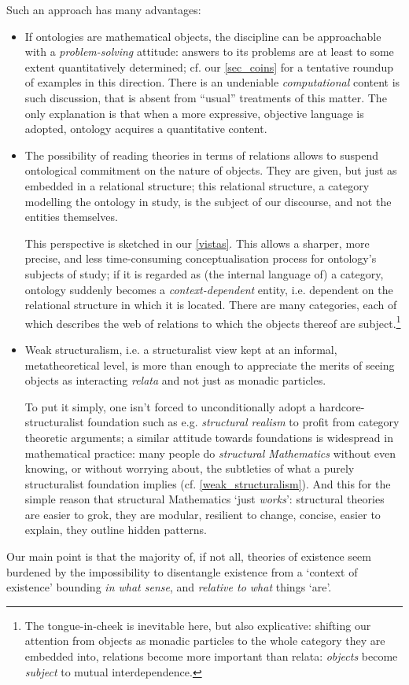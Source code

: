 Such an approach has many advantages:
\begin{itemize}
    \item If ontologies are mathematical objects, the discipline can be approachable with a \emph{problem-solving} attitude: answers to its problems are at least to some extent quantitatively determined; cf. our \autoref{sec_coins} for a tentative roundup of examples in this direction. There is an undeniable \emph{computational} content is such discussion, that is absent from ``usual'' treatments of this matter. The only explanation is that when a more expressive, objective language is adopted, ontology acquires a quantitative content.
    \item The possibility of reading theories in terms of relations allows to suspend ontological commitment on the nature of objects. They are given, but just as embedded in a relational structure; this relational structure, a category modelling the ontology in study, is the subject of our discourse, and not the entities themselves. 
    
    This perspective is sketched in our \autoref{vistas}. This allows a sharper, more precise, and less time-consuming conceptualisation process for ontology's subjects of study; if it is regarded as (the internal language of) a category, ontology suddenly becomes a \emph{context-dependent} entity, i.e. dependent on the relational structure in which it is located. There are many categories, each of which describes the web of relations to which the objects thereof are subject.\footnote{The tongue-in-cheek is inevitable here, but also explicative: shifting our attention from objects as monadic particles to the whole category they are embedded into, relations become more important than relata: \emph{objects} become \emph{subject} to mutual interdependence.}
    \item Weak structuralism, i.e. a structuralist view kept at an informal, metatheoretical level, is more than enough to appreciate the merits of seeing objects as interacting \emph{relata} and not just as monadic particles.
    
    To put it simply, one isn't forced to unconditionally adopt a hardcore-structuralist foundation such as e.g. \emph{structural realism} \cite{bain2013category,eva2016category} to profit from category theoretic arguments; a similar attitude towards foundations is widespread in mathematical practice: many people do \textit{structural Mathematics} without even knowing, or without worrying about, the subtleties of what a purely structuralist foundation implies (cf. \autoref{weak_structuralism}). And this for the simple reason that structural Mathematics `just \emph{works}': structural theories are easier to grok, they are modular, resilient to change, concise, easier to explain, they outline hidden patterns.
\end{itemize}
Our main point is that the majority of, if not all, theories of existence seem burdened by the impossibility to disentangle existence from a `context of existence' bounding \emph{in what sense}, and \emph{relative to what} things `are'. 

